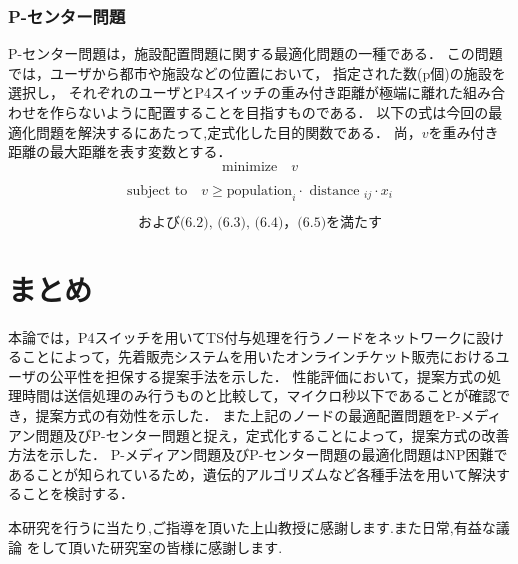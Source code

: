 \documentclass[a4j,11pt]{jreport}
\begin{document}
\subsection{P-センター問題}
P-センター問題は，施設配置問題に関する最適化問題の一種である．
この問題では，ユーザから都市や施設などの位置において，
指定された数(p個)の施設を選択し，
それぞれのユーザとP4スイッチの重み付き距離が極端に離れた組み合わせを作らないように配置することを目指すものである．
以下の式は今回の最適化問題を解決するにあたって,定式化した目的関数である．
尚，$v$を重み付き距離の最大距離を表す変数とする．
\begin{equation}
  \mbox{minimize} \quad v
\end{equation}

\begin{equation}
  \text{subject to} \quad v \geq \mbox{population}_i \cdot \mbox { distance }_{i j} \cdot x_{i}
\end{equation}

$$
  \mbox{および(6.2), (6.3), (6.4)，(6.5)を満たす}
$$


\chapter{まとめ}
本論では，P4スイッチを用いてTS付与処理を行うノードをネットワークに設けることによって，先着販売システムを用いたオンラインチケット販売におけるユーザの公平性を担保する提案手法を示した．
性能評価において，提案方式の処理時間は送信処理のみ行うものと比較して，マイクロ秒以下であることが確認でき，提案方式の有効性を示した．
また上記のノードの最適配置問題をP-メディアン問題及びP-センター問題と捉え，定式化することによって，提案方式の改善方法を示した．
P-メディアン問題及びP-センター問題の最適化問題はNP困難であることが知られているため，遺伝的アルゴリズムなど各種手法を用いて解決することを検討する．

本研究を行うに当たり,ご指導を頂いた上山教授に感謝します.また日常,有益な議論
をして頂いた研究室の皆様に感謝します.
\end{document}
